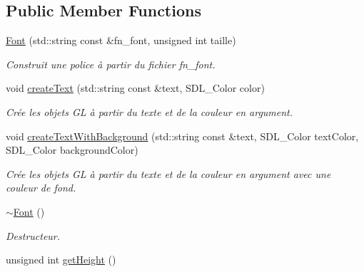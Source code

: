 \subsection*{Public Member Functions}
\begin{DoxyCompactItemize}
\item 
\hypertarget{classFont_a7ec05e69ec8490a65bb9905d44d57012}{\hyperlink{classFont_a7ec05e69ec8490a65bb9905d44d57012}{Font} (std\-::string const \&fn\-\_\-font, unsigned int taille)}\label{classFont_a7ec05e69ec8490a65bb9905d44d57012}

\begin{DoxyCompactList}\small\item\em Construit une police à partir du fichier fn\-\_\-font. \end{DoxyCompactList}\item 
\hypertarget{classFont_a28cfa9fa2ad26801f300007ad7ef52a0}{void \hyperlink{classFont_a28cfa9fa2ad26801f300007ad7ef52a0}{create\-Text} (std\-::string const \&text, S\-D\-L\-\_\-\-Color color)}\label{classFont_a28cfa9fa2ad26801f300007ad7ef52a0}

\begin{DoxyCompactList}\small\item\em Crée les objets G\-L à partir du texte et de la couleur en argument. \end{DoxyCompactList}\item 
\hypertarget{classFont_a0eb98cf6abe4b13b39d677913da7d209}{void \hyperlink{classFont_a0eb98cf6abe4b13b39d677913da7d209}{create\-Text\-With\-Background} (std\-::string const \&text, S\-D\-L\-\_\-\-Color text\-Color, S\-D\-L\-\_\-\-Color background\-Color)}\label{classFont_a0eb98cf6abe4b13b39d677913da7d209}

\begin{DoxyCompactList}\small\item\em Crée les objets G\-L à partir du texte et de la couleur en argument avec une couleur de fond. \end{DoxyCompactList}\item 
\hypertarget{classFont_a134aaa2f78af0c12d3ce504957169768}{\hyperlink{classFont_a134aaa2f78af0c12d3ce504957169768}{$\sim$\-Font} ()}\label{classFont_a134aaa2f78af0c12d3ce504957169768}

\begin{DoxyCompactList}\small\item\em Destructeur. \end{DoxyCompactList}\item 
\hypertarget{classFont_a50481f4b9b551b4b4fcf45e9dee43658}{unsigned int \hyperlink{classFont_a50481f4b9b551b4b4fcf45e9dee43658}{get\-Height} ()}\label{classFont_a50481f4b9b551b4b4fcf45e9dee43658}


\end{DoxyCompactItemize}
